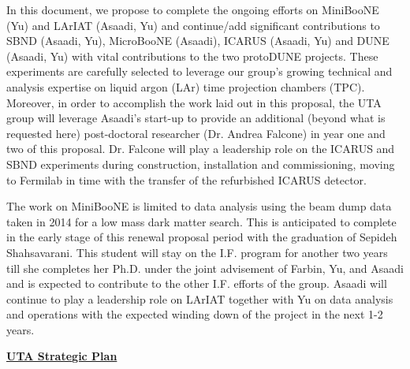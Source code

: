In this document, we propose to complete the ongoing efforts on MiniBooNE (Yu) and LArIAT (Asaadi, Yu) and continue/add significant contributions to SBND (Asaadi, Yu), MicroBooNE (Asaadi), ICARUS (Asaadi, Yu) and DUNE (Asaadi, Yu) with vital contributions to the two protoDUNE projects. These experiments are carefully selected to leverage our group's growing technical and analysis expertise on liquid argon (LAr) time projection chambers (TPC). Moreover, in order to accomplish the work laid out in this proposal, the UTA group will leverage Asaadi's start-up to provide an additional (beyond what is requested here) post-doctoral researcher (Dr. Andrea Falcone) in year one and two of this proposal. Dr. Falcone will play a leadership role on the ICARUS and SBND experiments during construction, installation and commissioning, moving to Fermilab in time with the transfer of the refurbished ICARUS detector.

The work on MiniBooNE is limited to data analysis using the beam dump data taken in 2014 for a low mass dark matter search. This is anticipated to complete in the early stage of this renewal proposal period with the graduation of Sepideh Shahsavarani. This student will stay on the I.F. program for another two years till she completes her Ph.D. under the joint advisement of Farbin, Yu, and Asaadi and is expected to contribute to the other I.F. efforts of the group. 
Asaadi will continue to play a leadership role on LArIAT together with Yu on data analysis and operations with the expected winding down of the project in the next 1-2 years.

\begin{center}
\textbf{\underline{UTA Strategic Plan} }\label{sec:strategic-plan}
\end{center}

